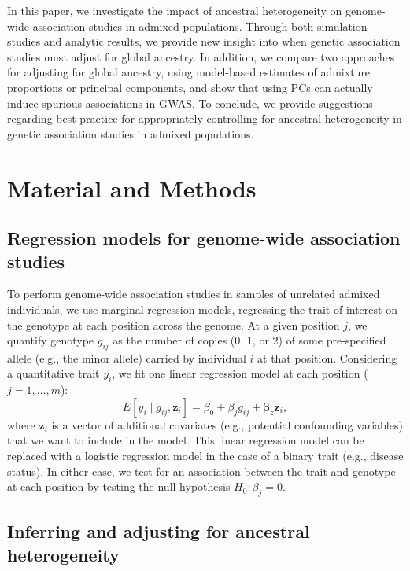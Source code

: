 \documentclass[12pt]{article}
\begin{document}
In this paper, we investigate the impact of ancestral heterogeneity on genome-wide association studies in admixed populations.
Through both simulation studies and analytic results, we provide new insight into when genetic association studies must adjust for global ancestry.
In addition, we compare two approaches for adjusting for global ancestry, using model-based estimates of admixture proportions or principal components, and show that using PCs can actually induce spurious associations in GWAS.
To conclude, we provide suggestions regarding best practice for appropriately controlling for ancestral heterogeneity in genetic association studies in admixed populations.



\section{Material and Methods}


\subsection{Regression models for genome-wide association studies}

To perform genome-wide association studies in samples of unrelated admixed individuals, we use marginal regression models, regressing the trait of interest on the genotype at each position across the genome. 
At a given position $j$, we quantify genotype $g_{ij}$ as the number of copies (0, 1, or 2) of some pre-specified allele (e.g., the minor allele) carried by individual $i$ at that position. 
Considering a quantitative trait $y_i$, we fit one linear regression model at each position ($j = 1, \dots, m$): $$E[y_i \mid g_{ij}, \mathbf{z}_i] = \beta_0 + \beta_j g_{ij} + \boldsymbol{\beta}_z \mathbf{z}_i,$$ where $\mathbf{z}_i$ is a vector of additional covariates (e.g., potential confounding variables) that we want to include in the model.
This linear regression model can be replaced with a logistic regression model in the case of a binary trait (e.g., disease status).
In either case, we test for an association between the trait and genotype at each position by testing the null hypothesis $H_0: \beta_j = 0$. 


\subsection{Inferring and adjusting for ancestral heterogeneity}
\end{document}
